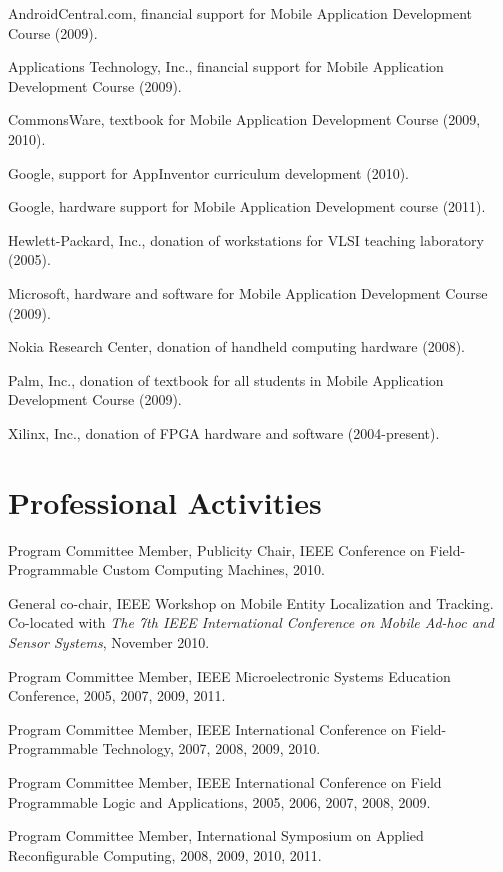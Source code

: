 \documentclass[line]{res}
\begin{document}
\begin{resume}
	AndroidCentral.com, financial support for Mobile Application Development Course (2009).
	
	Applications Technology, Inc., financial support for Mobile Application Development Course (2009).
	
	CommonsWare, textbook for Mobile Application Development Course (2009, 2010).
	
	Google, support for AppInventor curriculum development (2010).
	
	Google, hardware support for Mobile Application Development course (2011).
	
	Hewlett-Packard, Inc., donation of workstations for VLSI teaching laboratory (2005).
	
	Microsoft, hardware and software for Mobile Application Development Course (2009).
	
	Nokia Research Center, donation of handheld computing hardware (2008).
	
	Palm, Inc., donation of textbook for all students in Mobile Application Development Course (2009).
	
	Xilinx, Inc., donation of FPGA hardware and software (2004-present).
	
	\section{\sc Professional Activities}
	
	Program Committee Member, Publicity Chair, IEEE Conference on Field-Programmable Custom Computing Machines, 2010.
	
	General co-chair, IEEE Workshop on Mobile Entity Localization and Tracking. Co-located with \textit{The 7th IEEE International Conference on Mobile Ad-hoc and Sensor Systems}, November 2010.
	
	Program Committee Member, IEEE Microelectronic Systems Education Conference, 2005, 2007, 2009, 2011.
	
	Program Committee Member, IEEE International Conference on Field-Programmable Technology, 2007, 2008, 2009, 2010.
	
	Program Committee Member, IEEE International Conference on Field Programmable Logic and Applications, 2005, 2006, 2007, 2008, 2009.
	
	Program Committee Member, International Symposium on Applied Reconfigurable Computing, 2008, 2009, 2010, 2011.
	

\end{resume}
\end{document}
